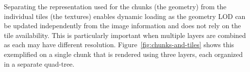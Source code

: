 \documentclass[journal]{vgtc}                %
\newcommand{\kallecomment}[1]{\textbf{[-Kalle-~}
    \textcolor{orange}{#1}
    \textbf{~]}}
\newcommand{\emilcomment}[1]{\textbf{[-Emil-~}
    \textcolor{red}{#1}
    \textbf{~]}}
\newcommand{\plgrem}[1]{\textcolor{blue}{~\textbf{!!}~}}
\newcommand{\fig}[1]{Figure~\ref{fig:#1}}
\begin{document}
Separating the representation used for the chunks (the geometry) from the individual tiles (the textures) enables dynamic loading as the geometry LOD can be updated independently from the image information and does not rely on the tile availability.
This is particularly important when multiple layers are combined as each may have different resolution.
\fig{chunks-and-tiles} shows this exemplified on a single chunk that is rendered using three layers, each organized in a separate quad-tree.

% 
% 
% 
% 
% 
% 
% 
\end{document}
